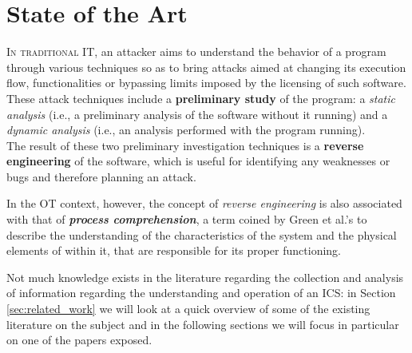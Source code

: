 \chapter{State of the Art}
\label{state_of_art}
\linenumbers

\lettrine[lines=2]{I}{n traditional IT}, an attacker aims to understand the behavior of a program through various techniques so as to bring attacks aimed at changing its execution flow, functionalities or bypassing limits imposed by the licensing of such software. These attack techniques include a \textbf{preliminary study} of the program: a \textit{static analysis} (i.e., a preliminary analysis of the software without it running) and a \textit{dynamic analysis} (i.e., an analysis performed with the program running).\\
The result of these two preliminary investigation techniques is a \textbf{reverse engineering} of the software, which is useful for identifying any weaknesses or bugs and therefore planning an attack.

\bigskip
In the OT context, however, the concept of \textit{reverse engineering} is also associated with that of \textit{\textbf{process comprehension}}, a term coined by Green et al.'s \cite{green_et_al} to describe the understanding of the characteristics of the system and the physical elements of within it, that are responsible for its proper functioning.

\bigskip
Not much knowledge exists in the literature regarding the collection and analysis of information regarding the understanding and operation of an ICS: in Section \ref{sec:related_work} we will look at a quick overview of some of the existing literature on the subject and in the following sections we will focus in particular on one of the papers exposed.

\vfill


